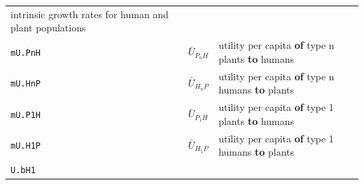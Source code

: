 \documentclass[]{book}
\begin{document}
\begin{longtable}[]{@{}lll@{}}
\begin{minipage}[t]{0.40\columnwidth}
intrinsic growth rates for human and plant populations\strut
\end{minipage}\tabularnewline
\begin{minipage}[t]{0.27\columnwidth}\raggedright
\texttt{mU.PnH}\strut
\end{minipage} & \begin{minipage}[t]{0.25\columnwidth}\raggedright
\(\bar{U}_{P_{n}H}\)\strut
\end{minipage} & \begin{minipage}[t]{0.40\columnwidth}\raggedright
utility per capita \textbf{of} type n plants \textbf{to} humans\strut
\end{minipage}\tabularnewline
\begin{minipage}[t]{0.27\columnwidth}\raggedright
\texttt{mU.HnP}\strut
\end{minipage} & \begin{minipage}[t]{0.25\columnwidth}\raggedright
\(\bar{U}_{H_{n}P}\)\strut
\end{minipage} & \begin{minipage}[t]{0.40\columnwidth}\raggedright
utility per capita \textbf{of} type n humans \textbf{to} plants\strut
\end{minipage}\tabularnewline
\begin{minipage}[t]{0.27\columnwidth}\raggedright
\texttt{mU.P1H}\strut
\end{minipage} & \begin{minipage}[t]{0.25\columnwidth}\raggedright
\(\bar{U}_{P_{1}H}\)\strut
\end{minipage} & \begin{minipage}[t]{0.40\columnwidth}\raggedright
utility per capita \textbf{of} type 1 plants \textbf{to} humans\strut
\end{minipage}\tabularnewline
\begin{minipage}[t]{0.27\columnwidth}\raggedright
\texttt{mU.H1P}\strut
\end{minipage} & \begin{minipage}[t]{0.25\columnwidth}\raggedright
\(\bar{U}_{H_{1}P}\)\strut
\end{minipage} & \begin{minipage}[t]{0.40\columnwidth}\raggedright
utility per capita \textbf{of} type 1 humans \textbf{to} plants\strut
\end{minipage}\tabularnewline
\begin{minipage}[t]{0.27\columnwidth}\raggedright
\texttt{U.bH1}\strut
\end{minipage} & \begin{minipage}[t]{0.25\columnwidth}\raggedright

\end{minipage}
\end{longtable}
\end{document}
